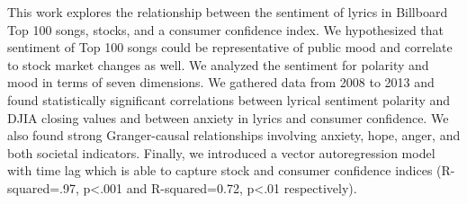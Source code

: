 This work explores the relationship between the sentiment of lyrics in Billboard Top 100 songs, stocks, and a consumer confidence index. We hypothesized that sentiment of Top 100 songs could be representative of public mood and correlate to stock market changes as well. We analyzed the sentiment for polarity and mood in terms of seven dimensions. We gathered data from 2008 to 2013 and found statistically significant correlations between lyrical sentiment polarity and DJIA closing values and between anxiety in lyrics and consumer confidence. We also found strong Granger-causal relationships involving anxiety, hope, anger, and both societal indicators. Finally, we introduced a vector autoregression model with time lag which is able to capture stock and consumer confidence indices (R-squared=.97, p<.001 and R-squared=0.72, p<.01 respectively).
